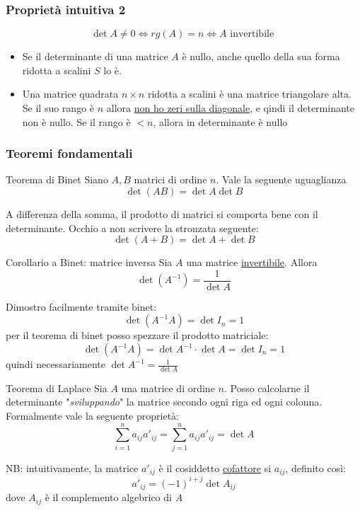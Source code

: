 \subsubsection*{Proprietà intuitiva 2}
\[
	\det A \neq 0 \Leftrightarrow rg\left( A \right)  = n \Leftrightarrow A \text{ invertibile }
\]
\begin{itemize}
	\item Se il determinante di una matrice $ A $ è nullo,  anche quello della sua forma ridotta a scalini $ S $ lo è.
	\item Una matrice quadrata $ n\times n $ ridotta a scalini è una matrice triangolare alta. Se il suo rango è $ n $ allora \underline{non ho zeri sulla diagonale}, e qindi il determinante non è nullo. Se il rango è $ < n $, allora in determinante è nullo
\end{itemize}
\subsubsection*{Teoremi fondamentali}
\begin{teorema}{Teorema di Binet}
	Siano $ A, B $ matrici di ordine $ n $. Vale la seguente uguaglianza
	\[
		\det \left( AB \right) = \det A \det B
	\]
\end{teorema}
A differenza della somma, il prodotto di matrici si comporta bene con il determinante. Occhio a non scrivere la stronzata seguente:
\[
	\det \left( A+B \right) = \det A + \det B
\]
\begin{teorema}{Corollario a Binet: matrice inversa}
	Sia $ A $ una matrice \underline{invertibile}. Allora
	\[
		\det\left( A^{-1} \right) = \frac{1}{ \det A}
	\]
\end{teorema}
\label{corollariobinet}
Dimostro facilmente tramite binet:
\[
	\det \left( A^{-1}A \right) = \det I_n = 1
\]
per il teorema di binet posso spezzare il prodotto matriciale:
\[
	\det \left( A^{-1}A \right)  = \det A^{-1} \cdot \det A = \det I_n = 1
\]
quindi necessariamente $ \det A^{-1} = \frac{1}{ \det A} $
\begin{teorema}{Teorema di Laplace}
	Sia $ A  $ una matrice di ordine $ n $. Posso calcolarne il determinante "\textit{sviluppando}" la matrice secondo ogni riga ed ogni colonna. Formalmente vale la seguente proprietà:
	\[
		\sum_{i=1}^{n} a_{ij}a'_{ij}= \sum_{j=1}^{n} a_{ij}a'_{ij} = \det A
	\]
\end{teorema}
NB: intuitivamente, la matrice $ a'_{ij} $ è il cosiddetto \underline{cofattore} si $ a_{ij} $, definito così:
\[
	a'_{ij}= \left( -1 \right) ^{i+j} \det A_{ij}
\]
dove $ A_{ij} $ è il complemento algebrico di $ A $
